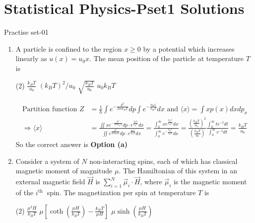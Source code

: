 \chapter{Statistical Physics-Pset1 Solutions}
\begin{abox}
	Practise set-01
\end{abox}
\begin{enumerate}
	\item A particle is confined to the region $x \geq 0$ by a potential which increases linearly as $u(x)=u_{0} x$. The mean position of the particle at temperature $T$ is
	{	}
	\begin{tasks}(2)
		\task[\textbf{a.}] $\frac{k_{B} T}{u_{0}}$
		\task[\textbf{b.}]$\left(k_{B} T\right)^{2} / u_{0}$
		\task[\textbf{c.}]$\sqrt{\frac{k_{B} T}{u_{0}}}$
		\task[\textbf{d.}]  $u_{0} k_{B} T$
	\end{tasks}
	\begin{answer}
		\begin{align*}
		\text{Partition function }Z&=\frac{1}{h} \int e^{-\frac{p^{2}}{2 m k_{B} T}} d p \int e^{-\frac{u_{0} x}{k_{B} T}} d x\text{ and }\langle x\rangle=\int x p(x) d x d p_{x}\\
		\Rightarrow\langle x\rangle&=\frac{\iint x e^{-\frac{p^{2}}{2 m k_{B} T}} d p \cdot e^{\frac{u_{0} x}{k_{B} T}} d x}{\iint e^{\frac{p^{2}}{2 m k_{B} T}} d p \cdot e^{\frac{u_{0} x}{k_{B} T}} d x}=\frac{\int_{0}^{\infty} x e^{\frac{\mu_{0} x}{k_{B} T}} d x}{\int_{0}^{\infty} e^{-\frac{\mu_{0} x}{k_{B} T}} d x}=\frac{\left(\frac{k_{B} T}{u_{0}}\right)^{2}}{\left(\frac{k_{B} T}{u_{0}}\right)} \frac{\int_{0}^{\infty} t e^{-t} d t}{\int_{0}^{\infty} e^{-t} d t}=\frac{k_{B} T}{u_{0}}
		\end{align*}
		So the correct answer is \textbf{Option (a)}
	\end{answer}
	\item 	Consider a system of $N$ non-interacting spins, each of which has classical magnetic moment of magnitude $\mu$. The Hamiltonian of this system in an external magnetic field $\vec{H}$ is $\sum_{i=1}^{N} \vec{\mu}_{i} \cdot \vec{H}$, where $\vec{\mu}_{i}$ is the magnetic moment of the $i^{\text {th }}$ spin. The magnetization per spin at temperature $T$ is
	{	}
	\begin{tasks}(2)
		\task[\textbf{a.}]$\frac{\mu^{2} H}{k_{B} T}$
		\task[\textbf{b.}]$\mu\left[\operatorname{coth}\left(\frac{\mu H}{k_{B} T}\right)-\frac{k_{B} T}{\mu H}\right]$
		\task[\textbf{c.}] $\mu \sinh \left(\frac{\mu H}{k_{B} T}\right)$

\end{tasks}
\end{enumerate}
